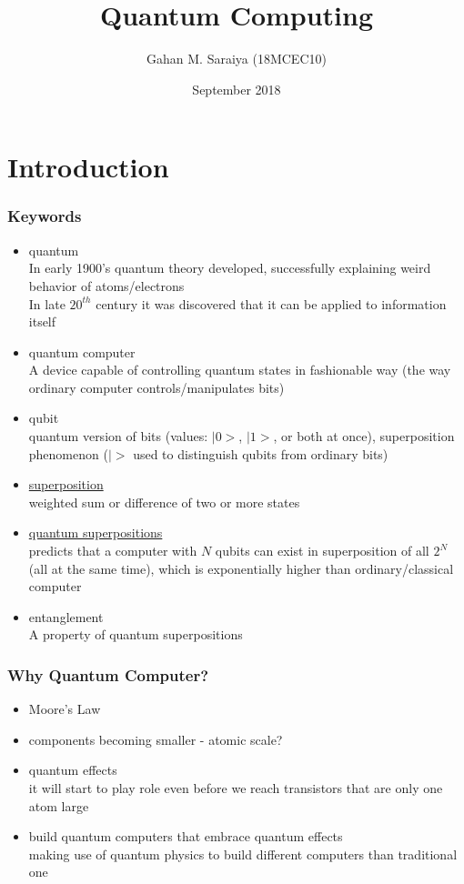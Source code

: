 \documentclass[xcolor=x11names,table]{beamer}
\title{Quantum Computing}
\author{Gahan M. Saraiya (18MCEC10)}
\institute{M.Tech (Computer Science and Engineering) 
	\\ Institute of Technology, Nirma University, Ahmedabad}
\date{{\scriptsize September 2018}}
\begin{document}
\begin{frame}
\titlepage
\end{frame}


\section{Introduction}

	\begin{frame}[allowframebreaks]
	\frametitle{Keywords}
		\begin{itemize}
			\item quantum
				{\scriptsize \\ In early 1900's quantum theory developed, successfully explaining weird behavior of atoms/electrons
				\\ In late $20^{th}$ century it was discovered that it can be applied to information itself}
			\item quantum computer
				{\scriptsize \\ A device capable of controlling quantum states in fashionable way (the way ordinary computer controls/manipulates bits)}
			\item qubit
				{\scriptsize \\ quantum version of bits (values: $|0>$, $|1>$, or both at once), superposition phenomenon
				($|>$ used to distinguish qubits from ordinary bits)}
			\item \href{https://en.wikipedia.org/wiki/Superposition_principle}{superposition}
				{\scriptsize \\ weighted sum or difference of two or more states}
			\item \href{https://en.wikipedia.org/wiki/Quantum_superposition}{quantum superpositions}
				{\scriptsize \\ predicts that a computer with $N$ qubits can exist in superposition of all $2^N$ (all at the same time), which is exponentially higher than ordinary/classical computer}
			\item {entanglement}
				{\scriptsize \\ A property of quantum superpositions}
		\end{itemize}
	\end{frame}
	
	
	\begin{frame}
	\frametitle{Why Quantum Computer?}
	
	\begin{itemize}
		\item Moore's Law
		\item components becoming smaller - atomic scale?
		\item quantum effects
			\\ {\scriptsize 
				it will start to play role even before we reach transistors that are only one atom large
			}
		\item build quantum computers that embrace quantum effects
			\\ {\scriptsize 
				making use of quantum physics to build different computers than traditional one
			}
	\end{itemize}
	\end{frame}
\end{document}
